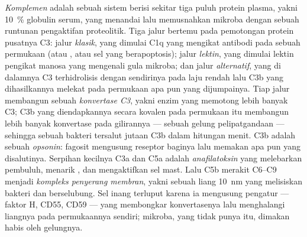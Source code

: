 \begin{definition}[Komplemen]\label{def:b3:innate-immunity:complement}
%
\emph{Komplemen} adalah sebuah sistem berisi sekitar tiga puluh protein plasma,
yakni \qty{10}{\%} globulin serum, yang menandai lalu memusnahkan mikroba
dengan sebuah runtunan pengaktifan proteolitik. Tiga jalur bertemu pada
pemotongan protein pusatnya C3: jalur \emph{klasik},
yang dimulai C1q yang mengikat antibodi pada sebuah permukaan (atau , atau sel yang berapoptosis); jalur \emph{lektin}, yang dimulai
lektin pengikat manosa yang mengenali gula mikroba; dan
jalur \emph{alternatif}, yang di dalamnya C3 terhidrolisis dengan sendirinya pada
laju rendah lalu C3b yang dihasilkannya melekat pada permukaan apa pun yang
dijumpainya. Tiap jalur membangun sebuah \emph{konvertase C3}, yakni enzim yang
memotong lebih banyak C3; C3b yang diendapkannya secara kovalen pada permukaan
itu membangun lebih banyak konvertase pada gilirannya --- sebuah gelung
pelipatgandaan --- sehingga sebuah bakteri tersalut jutaan C3b dalam hitungan
menit. C3b adalah sebuah \emph{opsonin}: fagosit mengusung reseptor baginya lalu
memakan apa pun yang disalutinya. Serpihan kecilnya C3a dan C5a adalah
\emph{anafilatoksin} yang melebarkan pembuluh, menarik
, dan mengaktifkan sel mast. Lalu C5b merakit C6--C9 menjadi
\emph{kompleks penyerang membran}, yakni sebuah liang \qty{10}{nm} yang
melisiskan bakteri  dan  berselubung. Sel inang terluput
karena ia mengusung pengatur --- faktor H, CD55, CD59 --- yang
membongkar konvertasenya lalu menghalangi liangnya pada permukaannya sendiri;
mikroba, yang tidak punya itu, dimakan habis oleh gelungnya.
\end{definition}

